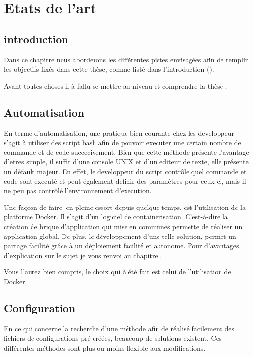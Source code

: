 \chapter{Etats de l'art}
\label{ch:state_art}

\section{introduction}
Dans ce chapitre nous aborderons les différentes pistes envisagées afin de remplir les objectifs fixés dans cette thèse, comme listé dans l'introduction ().

Avant toutes choses il à fallu se mettre au niveau et comprendre la thèse \thLeite.

\section{Automatisation}
En terme d'automatisation, une pratique bien courante chez les developpeur s'agit à utiliser des script bash afin de pouvoir executer une certain nombre de commande et de code succecivement. Bien que cette méthode présente l'avantage d'etres simple, il suffit d'une console UNIX et d'un editeur de texte, elle présente un défault majeur. En effet, le developpeur du script contrôle quel commande et code sont executé et peut également definir des paramètres pour ceux-ci, mais il ne peu pas contrôlé l'environnement d'execution.

Une façcon de faire, en pleine essort depuis quelque temps, est l'utilisation de la platforme Docker. Il s'agit d'un logiciel de containerisation. C'est-à-dire la création de brique d'application qui mise en communes permette de réaliser un application global. De plus, le développement d'une telle solution, permet un partage facilité grâce à un déploiement facilité et autonome. Pour d'avantages d'explication sur le sujet je vous renvoi au chapitre  .

Vous l'aurez bien compris, le choix qui à été fait est celui de l'utilisation de Docker.

\section{Configuration}

En ce qui concerne la recherche d'une méthode afin de réalisé facilement des fichiers de configurations pré-créées, beaucoup de solutions existent. Ces différentes méthodes sont plus ou moins flexible aux modifications.

